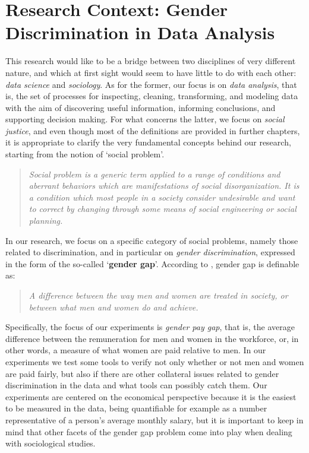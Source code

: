 \section{Research Context: Gender Discrimination in Data Analysis}
This research would like to be a bridge between two disciplines of very different nature, and which at first sight would seem to have little to do with each other: \textit{data science} and \textit{sociology}. As for the former, our focus is on \textit{data analysis}, that is, the set of processes for inspecting, cleaning, transforming, and modeling data with the aim of discovering useful information, informing conclusions, and supporting decision making. For what concerns the latter, we focus on \textit{social justice}, and even though most of the definitions are provided in further chapters, it is appropriate to clarify the very fundamental concepts behind our research, starting from the notion of `social problem'.
\begin{quote}\emph{Social problem is a generic term applied to a range of conditions and aberrant behaviors which are manifestations of social disorganization. It is a condition which most people in a society consider undesirable and want to correct by changing through some means of social engineering or social planning.} \cite{marschall1998oxford}\end{quote}

In our research, we focus on a specific category of social problems, namely those related to discrimination, and in particular on \textit{gender discrimination}, expressed in the form of the so-called `\textbf{gender gap}'. According to \cite{cambridge2013gender}, gender gap is definable as:
\begin{quote}\emph{A difference between the way men and women are treated in society, or between what men and women do and achieve.} \cite{cambridge2013gender}\end{quote}

Specifically, the focus of our experiments is \textit{gender pay gap}, that is, the average difference between the remuneration for men and women in the workforce, or, in other words, a measure of what women are paid relative to men. In our experiments we test some tools to verify not only whether or not men and women are paid fairly, but also if there are other collateral issues related to gender discrimination in the data and what tools can possibly catch them.
Our experiments are centered on the economical perspective because it is the easiest to be measured in the data, being quantifiable for example as a number representative of a person's average monthly salary, but it is important to keep in mind that other facets of the gender gap problem come into play when dealing with sociological studies.

